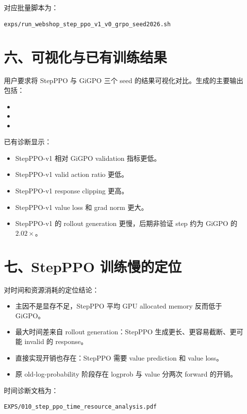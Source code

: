 \documentclass[10pt]{ctexart}
\begin{document}
对应批量脚本为：
\begin{verbatim}
exps/run_webshop_step_ppo_v1_v0_grpo_seed2026.sh
\end{verbatim}

\section*{六、可视化与已有训练结果}
用户要求将 StepPPO 与 GiGPO 三个 seed 的结果可视化对比。生成的主要输出包括：
\begin{itemize}
\item {}
\item {}
\item {}
\end{itemize}

已有诊断显示：
\begin{itemize}
\item StepPPO-v1 相对 GiGPO validation 指标更低。
\item StepPPO-v1 valid action ratio 更低。
\item StepPPO-v1 response clipping 更高。
\item StepPPO-v1 value loss 和 grad norm 更大。
\item StepPPO-v1 的 rollout generation 更慢，后期非验证 step 约为 GiGPO 的 $2.02\times$。
\end{itemize}

\section*{七、StepPPO 训练慢的定位}
对时间和资源消耗的定位结论：
\begin{itemize}
\item 主因不是显存不足，StepPPO 平均 GPU allocated memory 反而低于 GiGPO。
\item 最大时间差来自 rollout generation：StepPPO 生成更长、更容易截断、更可能 invalid 的 response。
\item 直接实现开销也存在：StepPPO 需要 value prediction 和 value loss。
\item 原 old-log-probability 阶段存在 logprob 与 value 分两次 forward 的开销。
\end{itemize}

时间诊断文档为：
\begin{verbatim}
EXPS/010_step_ppo_time_resource_analysis.pdf
\end{verbatim}
\end{document}
